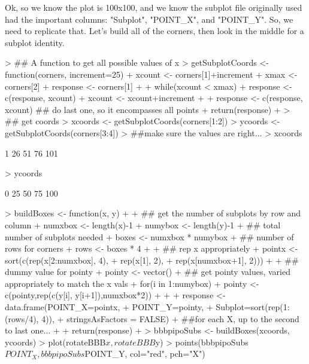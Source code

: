 \documentclass{article}
\begin{document}
Ok, so we know the plot is 100x100, and we know the subplot file originally used had the important columns: "Subplot", "POINT\_X", and "POINT\_Y". So, we need to replicate that. Let's build all of the corners, then look in the middle for a subplot identity.

\begin{Schunk}
\begin{Sinput}
> ## A function to get all possible values of x
> getSubplotCoords <- function(corners, increment=25){
+   xcount <- corners[1]+increment
+   xmax <- corners[2]
+   response <- corners[1]
+ 
+   while(xcount < xmax){
+     response <- c(response, xcount)
+     xcount <- xcount+increment
+   }
+   response <- c(response, xcount) ## do last one, so it encompasses all points
+   return(response)
+ }
> ## get coords
>   xcoords <- getSubplotCoords(corners[1:2])
>   ycoords <- getSubplotCoords(corners[3:4])
> ##make sure the values are right...
>   xcoords
\end{Sinput}
\begin{Soutput}
[1]   1  26  51  76 101
\end{Soutput}
\begin{Sinput}
>   ycoords
\end{Sinput}
\begin{Soutput}
[1]   0  25  50  75 100
\end{Soutput}
\begin{Sinput}
> buildBoxes <- function(x, y){
+ 
+   ## get the number of subplots by row and column
+   numxbox <- length(x)-1
+   numybox <- length(y)-1
+   ## total number of subplots needed
+   boxes <- numxbox * numybox
+   ## number of rows for corners
+   rows <- boxes * 4
+ 
+   ## rep x appropriately
+   pointx <- sort(c(rep(x[2:numxbox], 4),
+                    rep(x[1], 2),
+                    rep(x[numxbox+1], 2)))
+ 
+   ## dummy value for pointy
+   pointy <- vector()
+   ## get pointy values, varied appropriately to match the x vals
+   for(i in 1:numybox){
+     pointy <- c(pointy,rep(c(y[i], y[i+1]),numxbox*2))
+   }
+ 
+   response <- data.frame(POINT_X=pointx,
+                          POINT_Y=pointy,
+                          Subplot=sort(rep(1:(rows/4), 4)),
+                          stringsAsFactors = FALSE)
+   ##for each X, up to the second to last one...
+ 
+   return(response)
+ }
> bbbpipoSubs <- buildBoxes(xcoords, ycoords)
> plot(rotateBBB$x, rotateBBB$y)
> points(bbbpipoSubs$POINT_X, bbbpipoSubs$POINT_Y, col="red", pch="X")
\end{Sinput}
\end{Schunk}
\end{document}
